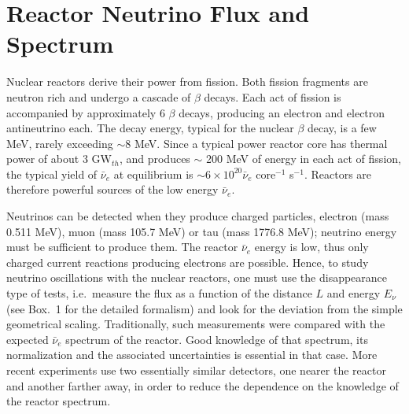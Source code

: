 \newpage
\section{Reactor Neutrino Flux and Spectrum} 
\label{sec:flux}

Nuclear reactors derive their power from fission. Both fission fragments are neutron rich and undergo a cascade of $\beta$ decays. Each act of fission
is accompanied by approximately 6 $\beta$ decays, producing an electron and electron antineutrino each. The decay energy, typical for the nuclear
$\beta$ decay, is a few MeV, rarely exceeding $\sim$8 MeV. Since a typical power reactor core has thermal power of about 3 GW$_{th}$, and produces
$\sim$ 200 MeV of energy in each act of fission, the typical yield of $\bar{\nu}_e$ at equilibrium is $\sim 6 \times 10^{20} \bar{\nu}_e$ core$^{-1}$ s$^{-1}$.   
Reactors are therefore powerful sources of the low energy $\bar{\nu}_e$.

Neutrinos can be detected when they produce charged particles, electron (mass 0.511 MeV),
muon (mass 105.7 MeV) or tau (mass 1776.8 MeV); neutrino energy must be sufficient to
produce them. The reactor $\bar{\nu}_e$ energy is low, thus only charged current reactions producing electrons are possible. Hence, to study neutrino oscillations with
the nuclear reactors, one must use the disappearance type of tests, i.e.~measure the flux as a function of the distance $L$ and energy $E_{\nu}$ (see Box.~1 for the detailed formalism) and
look for the deviation from the simple geometrical scaling. Traditionally, such measurements were compared with the expected  $\bar{\nu}_e$ spectrum
of the reactor. Good knowledge of that spectrum, its normalization and the associated uncertainties is essential in that case.  More recent experiments
\cite{Dayabay,Reno} use two essentially similar detectors, one nearer the reactor and another farther away, in order to reduce the dependence on the
knowledge of the reactor spectrum.

